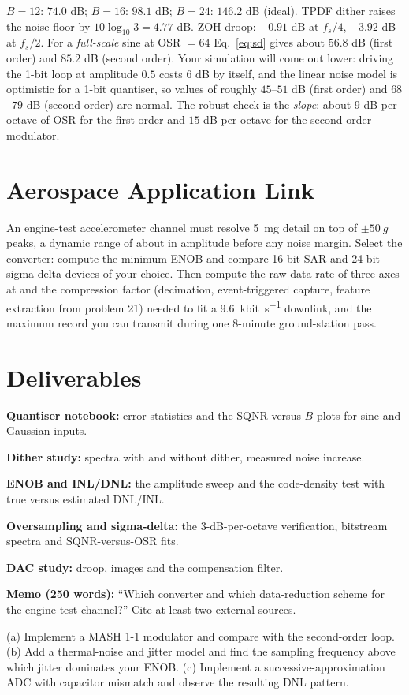 \documentclass[11pt,a4paper]{article}
\begin{document}
\begin{checkpoint}
$B=12$: $74.0$ dB; $B=16$: $98.1$ dB; $B=24$: $146.2$ dB (ideal). TPDF dither raises the noise floor by $10\log_{10}3=4.77$ dB. ZOH droop: $-0.91$ dB at $f_s/4$, $-3.92$ dB at $f_s/2$. For a \emph{full-scale} sine at OSR $=64$ Eq.~\eqref{eq:sd} gives about $56.8$ dB (first order) and $85.2$ dB (second order). Your simulation will come out lower: driving the 1-bit loop at amplitude $0.5$ costs $6$ dB by itself, and the linear noise model is optimistic for a 1-bit quantiser, so values of roughly $45$--$51$ dB (first order) and $68$--$79$ dB (second order) are normal. The robust check is the \emph{slope}: about $9$ dB per octave of OSR for the first-order and $15$ dB per octave for the second-order modulator.
\end{checkpoint}

\section*{Aerospace Application Link}
An engine-test accelerometer channel must resolve \SI{5}{\milli g} detail on top of $\pm\SI{50}{g}$ peaks, a dynamic range of about  in amplitude before any noise margin. Select the converter: compute the minimum ENOB and compare 16-bit SAR and 24-bit sigma-delta devices of your choice. Then compute the raw data rate of three axes at  and the compression factor (decimation, event-triggered capture, feature extraction from problem 21) needed to fit a \SI{9.6}{\kilo bit\per\second} downlink, and the maximum record you can transmit during one 8-minute ground-station pass.

\section*{Deliverables}
\begin{delivs}
  \item[D1] \textbf{Quantiser notebook:} error statistics and the SQNR-versus-$B$ plots for sine and Gaussian inputs.
  \item[D2] \textbf{Dither study:} spectra with and without dither, measured noise increase.
  \item[D3] \textbf{ENOB and INL/DNL:} the amplitude sweep and the code-density test with true versus estimated DNL/INL.
  \item[D4] \textbf{Oversampling and sigma-delta:} the 3-dB-per-octave verification, bitstream spectra and SQNR-versus-OSR fits.
  \item[D5] \textbf{DAC study:} droop, images and the compensation filter.
  \item[D6] \textbf{Memo (250 words):} ``Which converter and which data-reduction scheme for the engine-test channel?'' Cite at least two external sources.
  \item[Bonus] (a) Implement a MASH 1-1 modulator and compare with the second-order loop. (b) Add a thermal-noise and jitter model and find the sampling frequency above which jitter dominates your ENOB. (c) Implement a successive-approximation ADC with capacitor mismatch and observe the resulting DNL pattern.
\end{delivs}
\end{document}
